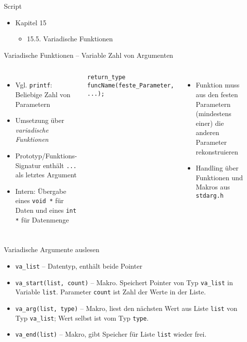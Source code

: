 
\begin{frame}{Script}
%
\begin{itemize}
\item Kapitel 15
	\begin{itemize}
	\item 15.5. Variadische Funktionen
	\end{itemize}
\end{itemize}
%
\end{frame}%

\begin{frame}[fragile]{Variadische Funktionen -- Variable Zahl von Argumenten}
%
\begin{columns}[T]
\begin{itemize}
\item Vgl. \texttt{printf}: Beliebige Zahl von Parametern
\item Umsetzung über \emph{variadische Funktionen}
\item Prototyp/Funktions-Signatur enthält \texttt{...} als letztes Argument
\item Intern: Übergabe eines \texttt{void *} für Daten und eines \texttt{int *} für Datenmenge
\end{itemize}
%
\begin{codebox}
\begin{verbatim}
return_type funcName(feste_Parameter, ...);
\end{verbatim}
%
\end{codebox}
\begin{itemize}
\item Funktion muss aus den festen Parametern (mindestens einer) die anderen Parameter rekonstruieren
\item Handling über Funktionen und Makros aus \texttt{stdarg.h}
\end{itemize}
\end{columns}
%
\end{frame}


\begin{frame}{Variadische Argumente auslesen}
%
\begin{itemize}
\item \texttt{va\_list} -- Datentyp, enthält beide Pointer
\item \texttt{va\_start(list, count)} -- Makro. Speichert Pointer von Typ \texttt{va\_list} in Variable \texttt{list}. Parameter \texttt{count} ist Zahl der Werte in der Liste.
\item \texttt{va\_arg(list, type)}  -- Makro, liest den nächsten Wert aus Liste \texttt{list} von Typ \texttt{va\_list}; Wert selbst ist vom Typ \texttt{type}.
\item \texttt{va\_end(list)} -- Makro, gibt Speicher für Liste \texttt{list} wieder frei.
\end{itemize}
%
\end{frame}

